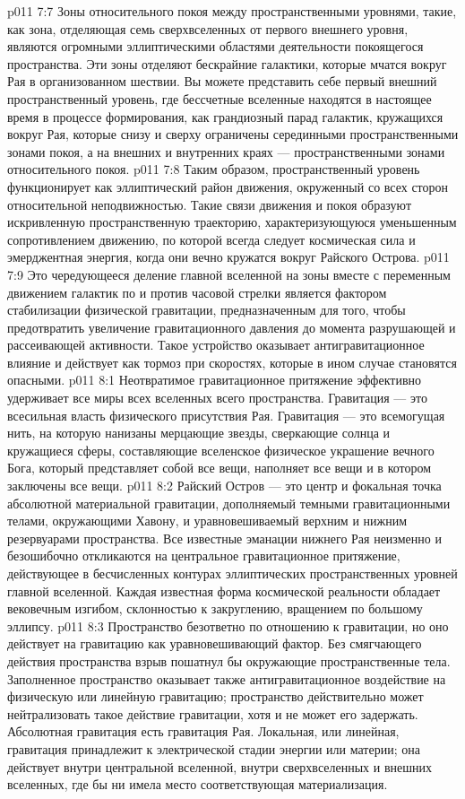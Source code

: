 \vs p011 7:7 \pc Зоны относительного покоя между пространственными уровнями, такие, как зона, отделяющая семь сверхвселенных от первого внешнего уровня, являются огромными эллиптическими областями деятельности покоящегося пространства. Эти зоны отделяют бескрайние галактики, которые мчатся вокруг Рая в организованном шествии. Вы можете представить себе первый внешний пространственный уровень, где бессчетные вселенные находятся в настоящее время в процессе формирования, как грандиозный парад галактик, кружащихся вокруг Рая, которые снизу и сверху ограничены серединными пространственными зонами покоя, а на внешних и внутренних краях --- пространственными зонами относительного покоя.
\vs p011 7:8 Таким образом, пространственный уровень функционирует как эллиптический район движения, окруженный со всех сторон относительной неподвижностью. Такие связи движения и покоя образуют искривленную пространственную траекторию, характеризующуюся уменьшенным сопротивлением движению, по которой всегда следует космическая сила и эмерджентная энергия, когда они вечно кружатся вокруг Райского Острова.
\vs p011 7:9 Это чередующееся деление главной вселенной на зоны вместе с переменным движением галактик по и против часовой стрелки является фактором стабилизации физической гравитации, предназначенным для того, чтобы предотвратить увеличение гравитационного давления до момента разрушающей и рассеивающей активности. Такое устройство оказывает антигравитационное влияние и действует как тормоз при скоростях, которые в ином случае становятся опасными.
\vs p011 8:1 Неотвратимое гравитационное притяжение эффективно удерживает все миры всех вселенных всего пространства. Гравитация --- это всесильная власть физического присутствия Рая. Гравитация --- это всемогущая нить, на которую нанизаны мерцающие звезды, сверкающие солнца и кружащиеся сферы, составляющие вселенское физическое украшение вечного Бога, который представляет собой все вещи, наполняет все вещи и в котором заключены все вещи.
\vs p011 8:2 Райский Остров --- это центр и фокальная точка абсолютной материальной гравитации, дополняемый темными гравитационными телами, окружающими Хавону, и уравновешиваемый верхним и нижним резервуарами пространства. Все известные эманации нижнего Рая неизменно и безошибочно откликаются на центральное гравитационное притяжение, действующее в бесчисленных контурах эллиптических пространственных уровней главной вселенной. Каждая известная форма космической реальности обладает вековечным изгибом, склонностью к закруглению, вращением по большому эллипсу.
\vs p011 8:3 Пространство безответно по отношению к гравитации, но оно действует на гравитацию как уравновешивающий фактор. Без смягчающего действия пространства взрыв пошатнул бы окружающие пространственные тела. Заполненное пространство оказывает также антигравитационное воздействие на физическую или линейную гравитацию; пространство действительно может нейтрализовать такое действие гравитации, хотя и не может его задержать. Абсолютная гравитация есть гравитация Рая. Локальная, или линейная, гравитация принадлежит к электрической стадии энергии или материи; она действует внутри центральной вселенной, внутри сверхвселенных и внешних вселенных, где бы ни имела место соответствующая материализация.
